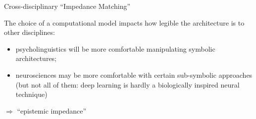 \documentclass[compress]{beamer}
\begin{document}
\begin{frame}{Cross-disciplinary ``Impedance Matching''}

    The choice of a computational model impacts how {\Medium legible} the architecture is
    to other disciplines:

    \begin{itemize}
        \item {\Medium psycholinguistics} will be more comfortable manipulating
            symbolic architectures;
        \item {\Medium neurosciences} may be more comfortable with certain
            sub-symbolic approaches (but not all of them: deep learning 
            is hardly a biologically inspired neural technique)
    \end{itemize}
    
    {\Medium $\Rightarrow$ ``epistemic impedance''}




\end{frame}
\end{document}
